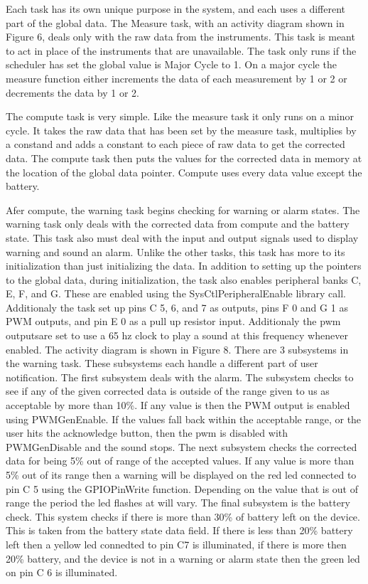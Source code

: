 \documentclass[12pt]{article} %
\begin{document}
Each task has its own unique purpose in the system, and each uses a different
part of the global data. The Measure task, with an activity diagram shown in
Figure 6, deals only with the raw data from the instruments. This task is meant
to act in place of the instruments that are unavailable. The task only runs if
the scheduler has set the global value is Major Cycle to 1. On a major cycle
the measure function either increments the data of each measurement by 1 or 2
or decrements the data by 1 or 2.

The compute task is very simple. Like the measure task it only runs on a minor
cycle. It takes the raw data that has been set by the measure task, multiplies
by a constand and adds a constant to each piece of raw data to get the
corrected data. The compute task then puts the values for the corrected data in
memory at the location of the global data pointer. Compute uses every data
value except the battery.

Afer compute, the warning task begins checking for warning or alarm states. The
warning task only deals with the corrected data from compute and the battery
state. This task also must deal with the input and output signals used to
display warning and sound an alarm. Unlike the other tasks, this task has more
to its initialization than just initializing the data. In addition to setting
up the pointers to the global data, during initialization, the task also
enables peripheral banks C, E, F, and G. These are enabled using the
SysCtlPeripheralEnable library call. Additionaly the task set up pins C 5, 6,
and 7 as outputs, pins F 0 and G 1 as PWM outputs, and pin E 0 as a pull up
resistor input. Additionaly the pwm outputsare set to use a 65 hz clock to play
a sound at this frequency whenever enabled. The activity diagram is shown in
Figure 8. There are 3 subsystems in the warning task. These subsystems each
handle a different part of user notification. The first subsystem deals with
the alarm. The subsystem checks to see if any of the given corrected data is
outside of the range given to us as acceptable by more than 10\%. If any value
is then the PWM output is enabled using PWMGenEnable. If the values fall back
within the acceptable range, or the user hits the acknowledge button, then the
pwm is disabled with PWMGenDisable and the sound stops. The next subsystem
checks the corrected data for being 5\% out of range of the accepted values. If
any value is more than 5\% out of its range then a warning will be displayed on
the red led connected to pin C 5 using the GPIOPinWrite function. Depending on
the value that is out of range the period the led flashes at will vary. The
final subsystem is the battery check. This system checks if there is more than
30\% of battery left on the device. This is taken from the battery state data
field. If there is less than 20\% battery left then a yellow led connedted to
pin C7 is illuminated, if there is more then 20\% battery, and the device is
not in a warning or alarm state then the green led on pin C 6 is illuminated. 
\end{document}
